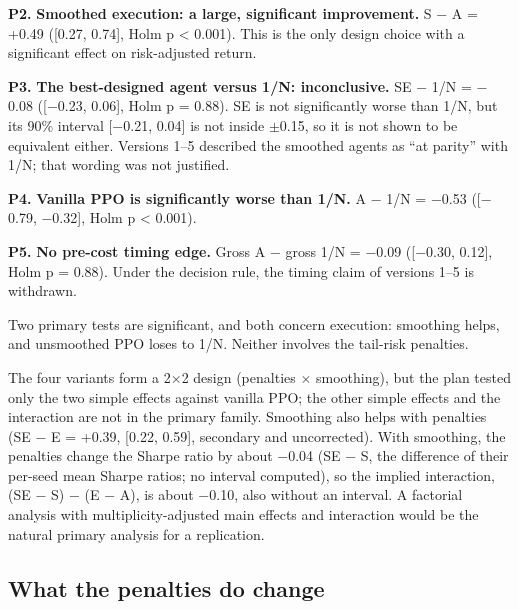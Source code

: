 \documentclass[11pt]{article}
\begin{document}
\textbf{P2.} \textbf{Smoothed execution: a large, significant improvement.} S $-$ A = +0.49 ({[}0.27, 0.74{]}, Holm p \textless{} 0.001). This is the only design choice with a significant effect on risk-adjusted return.

\textbf{P3.} \textbf{The best-designed agent versus 1/N: inconclusive.} SE $-$ 1/N = $-$0.08 ({[}$-$0.23, 0.06{]}, Holm p = 0.88). SE is not significantly worse than 1/N, but its 90\% interval {[}$-$0.21, 0.04{]} is not inside $\pm$0.15, so it is not shown to be equivalent either. Versions 1--5 described the smoothed agents as ``at parity'' with 1/N; that wording was not justified.

\textbf{P4.} \textbf{Vanilla PPO is significantly worse than 1/N.} A $-$ 1/N = $-$0.53 ({[}$-$0.79, $-$0.32{]}, Holm p \textless{} 0.001).

\textbf{P5.} \textbf{No pre-cost timing edge.} Gross A $-$ gross 1/N = $-$0.09 ({[}$-$0.30, 0.12{]}, Holm p = 0.88). Under the decision rule, the timing claim of versions 1--5 is withdrawn.

Two primary tests are significant, and both concern execution: smoothing helps, and unsmoothed PPO loses to 1/N. Neither involves the tail-risk penalties.

The four variants form a 2$\times$2 design (penalties $\times$ smoothing), but the plan tested only the two simple effects against vanilla PPO; the other simple effects and the interaction are not in the primary family. Smoothing also helps with penalties (SE $-$ E = +0.39, {[}0.22, 0.59{]}, secondary and uncorrected). With smoothing, the penalties change the Sharpe ratio by about $-$0.04 (SE $-$ S, the difference of their per-seed mean Sharpe ratios; no interval computed), so the implied interaction, (SE $-$ S) $-$ (E $-$ A), is about $-$0.10, also without an interval. A factorial analysis with multiplicity-adjusted main effects and interaction would be the natural primary analysis for a replication.

\subsection{What the penalties do change}\label{what-the-penalties-do-change}
\end{document}
